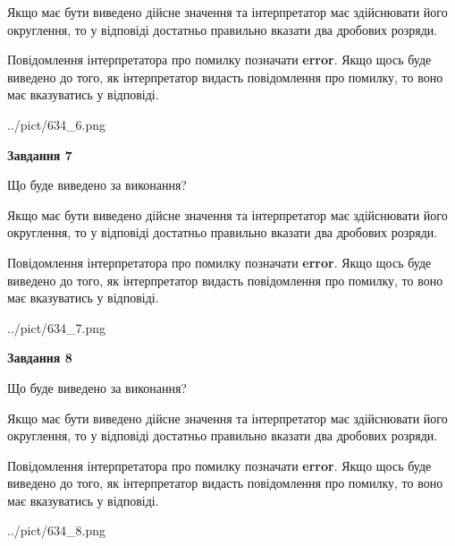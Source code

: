 \documentclass[12pt, ukrainian]{article}
\begin{document}
{\begin {Large}
Якщо має бути виведено дійсне значення та інтерпретатор має здійснювати його округлення, 
то у відповіді достатньо правильно вказати два дробових розряди.

Повідомлення інтерпретатора про помилку позначати \textbf{error}.
Якщо щось буде виведено до того, як інтерпретатор видасть повідомлення про помилку, 
то воно має вказуватись у відповіді. \par

\begin{center}
	{../pict/634_6.png}
\end{center}
\newpage

{\begin {center}\textbf{Завдання 7}\end {center}}\par
Що буде виведено за виконання? \par

Якщо має бути виведено дійсне значення та інтерпретатор має здійснювати його округлення, 
то у відповіді достатньо правильно вказати два дробових розряди.

Повідомлення інтерпретатора про помилку позначати \textbf{error}.
Якщо щось буде виведено до того, як інтерпретатор видасть повідомлення про помилку, 
то воно має вказуватись у відповіді. \par

\begin{center}
	{../pict/634_7.png}
\end{center}
\newpage

{\begin {center}\textbf{Завдання 8}\end {center}}\par
Що буде виведено за виконання? \par

Якщо має бути виведено дійсне значення та інтерпретатор має здійснювати його округлення, 
то у відповіді достатньо правильно вказати два дробових розряди.

Повідомлення інтерпретатора про помилку позначати \textbf{error}.
Якщо щось буде виведено до того, як інтерпретатор видасть повідомлення про помилку, 
то воно має вказуватись у відповіді. \par

\begin{center}
	{../pict/634_8.png}
\end{center}
\newpage


\end{Large}}
\end{document}
